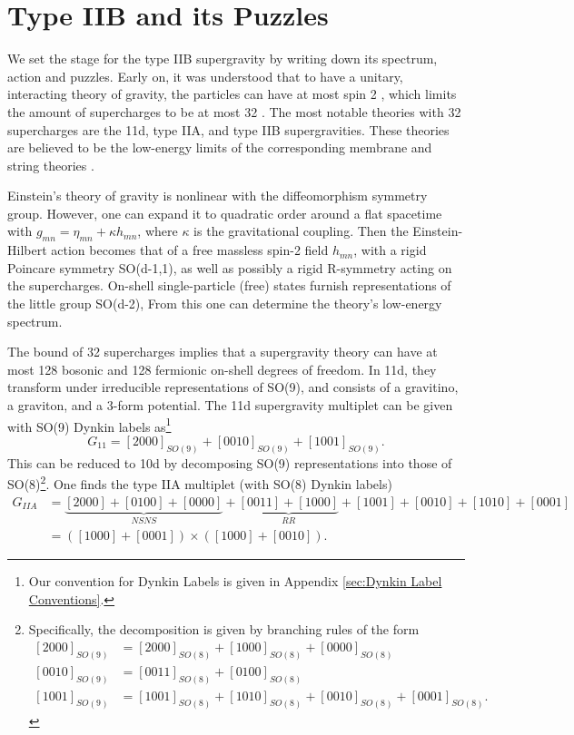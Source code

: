 \section{Type IIB and its Puzzles}
We set the stage for the type IIB supergravity by writing down its spectrum, action and puzzles.
Early on, it was understood that to have a unitary, interacting theory of gravity, the particles can have at most spin 2 \cite{Weinberg:1964ew,Weinberg:1965nx}, which limits the amount of supercharges to be at most 32 \cite{Nahm:1977tg}. 
The most notable theories with 32 supercharges are the 11d, type IIA, and type IIB supergravities. 
These theories are believed to be the low-energy limits of the corresponding membrane and string theories \cite{Green:2012oqa}.

{\color{orange}
Einstein's theory of gravity is nonlinear with the diffeomorphism symmetry group.
However, one can expand it to quadratic order around a flat spacetime with $g_{mn} = \eta_{mn} + \kappa h_{mn}$, where $\kappa$ is the gravitational coupling.
Then the Einstein-Hilbert action becomes that of a free massless spin-2 field $h_{mn}$, with a rigid Poincare symmetry SO(d-1,1), as well as possibly a rigid R-symmetry acting on the supercharges.
On-shell single-particle (free) states furnish representations of the little group SO(d-2), From this one can determine the theory's low-energy spectrum.

The bound of 32 supercharges implies that a supergravity theory can have at most 128 bosonic and 128 fermionic on-shell degrees of freedom.
In 11d, they transform under irreducible representations of SO(9), and consists of a gravitino, a graviton, and a 3-form potential.
The 11d supergravity multiplet can be given with SO(9) Dynkin labels as\footnote{Our convention for Dynkin Labels is given in Appendix \ref{sec:Dynkin Label Conventions}.}
\begin{equation}
G_{11} = [2000]_{SO(9)} + [0010]_{SO(9)} + [1001]_{SO(9)}.
\label{11d SUGRA multiplet}
\end{equation}
This can be reduced to 10d by decomposing SO(9) representations into those of SO(8)\footnote{
Specifically, the decomposition is given by branching rules of the form
\begin{equation}
\begin{aligned}
[2000]_{SO(9)} &= [2000]_{SO(8)} + [1000]_{SO(8)}+[0000]_{SO(8)}\\
[0010]_{SO(9)} &= [0011]_{SO(8)} + [0100]_{SO(8)}\\
[1001]_{SO(9)} &= [1001]_{SO(8)} + [1010]_{SO(8)}+[0010]_{SO(8)}+[0001]_{SO(8)}.
\end{aligned}
\end{equation}
}.
One finds the type IIA multiplet (with SO(8) Dynkin labels)
\begin{equation}
\begin{aligned}
G_{IIA} 
&= \underbrace{[2000]+[0100]+[0000]}_{NSNS} + \underbrace{[0011] + [1000]}_{RR} + [1001] + [0010] + [1010] + [0001]\\
&=([1000] + [0001]) \times ([1000] + [0010]).
\end{aligned}
\label{IIA multiplet}
\end{equation}
}

